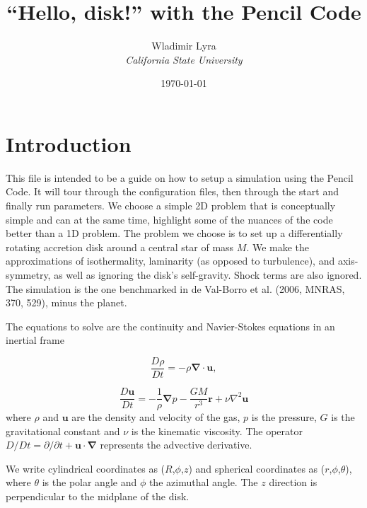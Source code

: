 \documentclass[a4paper,10pt]{article}
\newcommand{\pencilcode}{{\sc Pencil Code}}
\newcommand{\aderiv}[1]{\frac{D #1}{Dt}}
\renewcommand{\v}[1]{{\boldsymbol #1}} %
\newcommand{\del}{\v{\nabla}}
\newcommand{\grad}{\del}
\newcommand{\Div}{\v{\nabla}\cdot}
\newcommand{\Laplace}{\nabla^2}
\begin{document}
\date{}


\title{{\bf ``Hello, disk!'' with the \pencilcode}}


\author{Wladimir Lyra\\
{\it California State University}}               
\date{\today}  

\maketitle


\section{Introduction}

This file is intended to be a guide on how to setup a simulation using
the \pencilcode. It will tour through the configuration files, then
through the start and finally run parameters. We choose a simple 2D
problem that is conceptually simple and can at the same time,
highlight some of the nuances of the code better than a 1D
problem. The problem we choose is to set up a differentially rotating
accretion disk around a central star of mass $M$. We make the
approximations of isothermality, laminarity (as opposed to
turbulence), and axis-symmetry, as well as ignoring the disk's
self-gravity. Shock terms are also ignored. The simulation is the one
benchmarked in de Val-Borro et al. (2006, MNRAS, 370, 529), minus the planet. 

The equations to solve are the continuity and Navier-Stokes equations in an inertial frame

\begin{equation}
\label{continuity}
  \aderiv{\rho} = -\rho{\Div\v{u}}, 
\end{equation}

\begin{equation}
\label{navier-stokes}
  \aderiv{\v{u}} = -\frac{1}{\rho}\grad{p} - \frac{GM}{r^3}\v{r} + \nu\Laplace{\v{u}}
\end{equation}where $\rho$ and $\v{u}$ are the density and velocity of the gas, $p$ is the pressure, $G$ is the gravitational constant and $\nu$ is the kinematic viscosity. The operator ${D}/Dt = \partial /{\partial}t + \v{u}\cdot\del$ represents the advective derivative.

We write cylindrical coordinates as ($R$,$\phi$,$z$) and spherical coordinates as ($r$,$\phi$,$\theta$), where $\theta$ is the polar angle and $\phi$ the azimuthal angle. The $z$ direction is perpendicular to the midplane of the disk.
\end{document}
